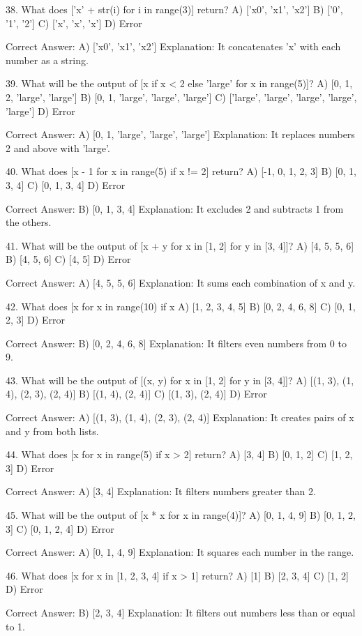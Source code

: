 38. What does ['x' + str(i) for i in range(3)] return?
A) ['x0', 'x1', 'x2']
B) ['0', '1', '2']
C) ['x', 'x', 'x']
D) Error

Correct Answer: A) ['x0', 'x1', 'x2']
Explanation: It concatenates 'x' with each number as a string.

39. What will be the output of [x if x < 2 else 'large' for x in range(5)]?
A) [0, 1, 2, 'large', 'large']
B) [0, 1, 'large', 'large', 'large']
C) ['large', 'large', 'large', 'large', 'large']
D) Error

Correct Answer: A) [0, 1, 'large', 'large', 'large']
Explanation: It replaces numbers 2 and above with 'large'.

40. What does [x - 1 for x in range(5) if x != 2] return?
A) [-1, 0, 1, 2, 3]
B) [0, 1, 3, 4]
C) [0, 1, 3, 4]
D) Error

Correct Answer: B) [0, 1, 3, 4]
Explanation: It excludes 2 and subtracts 1 from the others.

41. What will be the output of [x + y for x in [1, 2] for y in [3, 4]]?
A) [4, 5, 5, 6]
B) [4, 5, 6]
C) [4, 5]
D) Error

Correct Answer: A) [4, 5, 5, 6]
Explanation: It sums each combination of x and y.

42. What does [x for x in range(10) if x %
A) [1, 2, 3, 4, 5]
B) [0, 2, 4, 6, 8]
C) [0, 1, 2, 3]
D) Error

Correct Answer: B) [0, 2, 4, 6, 8]
Explanation: It filters even numbers from 0 to 9.

43. What will be the output of [(x, y) for x in [1, 2] for y in [3, 4]]?
A) [(1, 3), (1, 4), (2, 3), (2, 4)]
B) [(1, 4), (2, 4)]
C) [(1, 3), (2, 4)]
D) Error

Correct Answer: A) [(1, 3), (1, 4), (2, 3), (2, 4)]
Explanation: It creates pairs of x and y from both lists.

44. What does [x for x in range(5) if x > 2] return?
A) [3, 4]
B) [0, 1, 2]
C) [1, 2, 3]
D) Error

Correct Answer: A) [3, 4]
Explanation: It filters numbers greater than 2.

45. What will be the output of [x * x for x in range(4)]?
A) [0, 1, 4, 9]
B) [0, 1, 2, 3]
C) [0, 1, 2, 4]
D) Error

Correct Answer: A) [0, 1, 4, 9]
Explanation: It squares each number in the range.

46. What does [x for x in [1, 2, 3, 4] if x > 1] return?
A) [1]
B) [2, 3, 4]
C) [1, 2]
D) Error

Correct Answer: B) [2, 3, 4]
Explanation: It filters out numbers less than or equal to 1.

